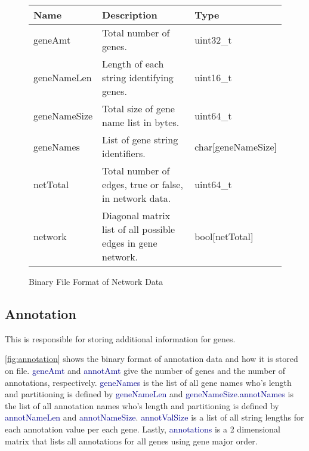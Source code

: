 \documentclass[10pt]{article}
\providecommand{\h}[1]{\textcolor{darkblue}{#1}}
\begin{document}
\begin{appendices}
\begin{figure}[H]
\begin{mdframed}[style=btable]
\begin{tabularx}{\textwidth}{|l|X|l|}
\hline
\textbf{Name} & \textbf{Description} & \textbf{Type} \\
\hline
geneAmt & Total number of genes. & uint32\_t \\
\hline
geneNameLen & Length of each string identifying genes. & uint16\_t \\
\hline
geneNameSize & Total size of gene name list in bytes. & uint64\_t \\
\hline
geneNames & List of gene string identifiers. & char[geneNameSize] \\
\hline
netTotal & Total number of edges, true or false, in network data. & uint64\_t \\
\hline
network & Diagonal matrix list of all possible edges in gene network. & 
bool[netTotal] \\
\hline
\end{tabularx}
\end{mdframed}
\caption{Binary File Format of Network Data}
\label{fig:network}
\end{figure}

\subsection{Annotation}

This is responsible for storing additional information for genes.

\autoref{fig:annotation} shows the binary format of annotation data and how it 
is stored on file. \h{geneAmt} and \h{annotAmt} give the number of genes and 
the number of annotations, respectively. \h{geneNames} is the list of all gene 
names who's length and partitioning is defined by \h{geneNameLen} and 
\h{geneNameSize}.\h{annotNames} is the list of all annotation names who's 
length and partitioning is defined by \h{annotNameLen} and \h{annotNameSize}.
\h{annotValSize} is a list of all string lengths for each annotation value per 
each gene. Lastly, \h{annotations} is a 2 dimensional matrix that lists all 
annotations for all genes using gene major order.


\end{appendices}
\end{document}
